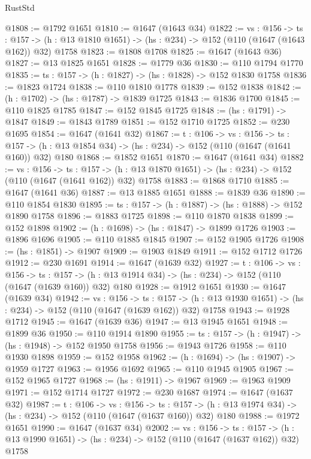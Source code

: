 \begin{lexlean}{RustStd}
\begin{coremodule}
@1808 := @1792 @1651
@1810 := @1647 (@1643 @34)
@1822 := {vs : @156} ->
  {ts : @157} -> (h : @13 @1810 @1651) -> (hs : @234) -> @152 (@110 (@1647 (@1643 @162)) @32) @1758
@1823 := @1808 @1708
@1825 := @1647 (@1643 @36)
@1827 := @13 @1825 @1651
@1828 := @1779 @36
@1830 := @110 @1794 @1770
@1835 := {ts : @157} -> (h : @1827) -> (hs : @1828) -> @152 @1830 @1758
@1836 := @1823 @1724
@1838 := @110 @1810 @1778
@1839 := @152 @1838
@1842 := (h : @1702) -> (hs : @1787) -> @1839 @1725
@1843 := @1836 @1700
@1845 := @110 @1825 @1785
@1847 := @152 @1845 @1725
@1848 := (hs : @1791) -> @1847
@1849 := @1843 @1789
@1851 := @152 @1710 @1725
@1852 := @230 @1695
@1854 := @1647 (@1641 @32)
@1867 := {t : @106} ->
  {vs : @156} ->
  {ts : @157} -> (h : @13 @1854 @34) -> (hs : @234) -> @152 (@110 (@1647 (@1641 @160)) @32) @180
@1868 := @1852 @1651
@1870 := @1647 (@1641 @34)
@1882 := {vs : @156} ->
  {ts : @157} -> (h : @13 @1870 @1651) -> (hs : @234) -> @152 (@110 (@1647 (@1641 @162)) @32) @1758
@1883 := @1868 @1710
@1885 := @1647 (@1641 @36)
@1887 := @13 @1885 @1651
@1888 := @1839 @36
@1890 := @110 @1854 @1830
@1895 := {ts : @157} -> (h : @1887) -> (hs : @1888) -> @152 @1890 @1758
@1896 := @1883 @1725
@1898 := @110 @1870 @1838
@1899 := @152 @1898
@1902 := (h : @1698) -> (hs : @1847) -> @1899 @1726
@1903 := @1896 @1696
@1905 := @110 @1885 @1845
@1907 := @152 @1905 @1726
@1908 := (hs : @1851) -> @1907
@1909 := @1903 @1849
@1911 := @152 @1712 @1726
@1912 := @230 @1691
@1914 := @1647 (@1639 @32)
@1927 := {t : @106} ->
  {vs : @156} ->
  {ts : @157} -> (h : @13 @1914 @34) -> (hs : @234) -> @152 (@110 (@1647 (@1639 @160)) @32) @180
@1928 := @1912 @1651
@1930 := @1647 (@1639 @34)
@1942 := {vs : @156} ->
  {ts : @157} -> (h : @13 @1930 @1651) -> (hs : @234) -> @152 (@110 (@1647 (@1639 @162)) @32) @1758
@1943 := @1928 @1712
@1945 := @1647 (@1639 @36)
@1947 := @13 @1945 @1651
@1948 := @1899 @36
@1950 := @110 @1914 @1890
@1955 := {ts : @157} -> (h : @1947) -> (hs : @1948) -> @152 @1950 @1758
@1956 := @1943 @1726
@1958 := @110 @1930 @1898
@1959 := @152 @1958
@1962 := (h : @1694) -> (hs : @1907) -> @1959 @1727
@1963 := @1956 @1692
@1965 := @110 @1945 @1905
@1967 := @152 @1965 @1727
@1968 := (hs : @1911) -> @1967
@1969 := @1963 @1909
@1971 := @152 @1714 @1727
@1972 := @230 @1687
@1974 := @1647 (@1637 @32)
@1987 := {t : @106} ->
  {vs : @156} ->
  {ts : @157} -> (h : @13 @1974 @34) -> (hs : @234) -> @152 (@110 (@1647 (@1637 @160)) @32) @180
@1988 := @1972 @1651
@1990 := @1647 (@1637 @34)
@2002 := {vs : @156} ->
  {ts : @157} -> (h : @13 @1990 @1651) -> (hs : @234) -> @152 (@110 (@1647 (@1637 @162)) @32) @1758

\end{coremodule}
\end{lexlean}
